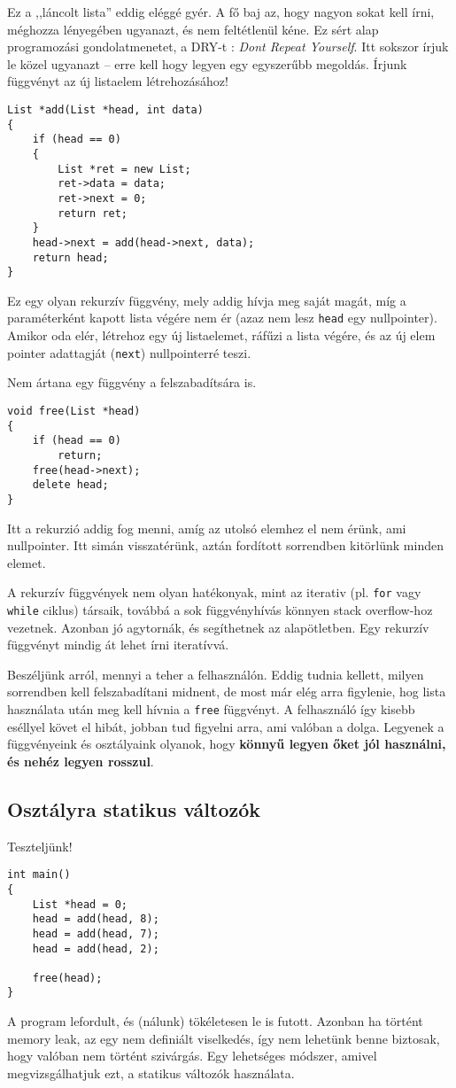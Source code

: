 \documentclass[a4paper,11.5pt]{article}
\begin{document}
	Ez a ,,láncolt lista'' eddig eléggé gyér. A fő baj az, hogy nagyon sokat kell írni, méghozza lényegében ugyanazt, és nem feltétlenül kéne. Ez sért alap programozási gondolatmenetet, a DRY-t : \textit{Dont Repeat Yourself}. Itt sokszor írjuk le közel ugyanazt -- erre kell hogy legyen egy egyszerűbb megoldás. Írjunk függvényt az új listaelem létrehozásához!
	\begin{lstlisting}
List *add(List *head, int data)
{
	if (head == 0)
	{
		List *ret = new List;
		ret->data = data;
		ret->next = 0;
		return ret;
	}
	head->next = add(head->next, data);
	return head;
}
	\end{lstlisting}
	Ez egy olyan rekurzív függvény, mely addig hívja meg saját magát, míg a paraméterként kapott lista végére nem ér (azaz nem lesz \texttt{head} egy nullpointer). Amikor oda elér, létrehoz egy új listaelemet, ráfűzi a lista végére, és az új elem pointer adattagját (\texttt{next}) nullpointerré teszi.
	\medskip
	
	Nem ártana egy függvény a felszabadítsára is.
	\begin{lstlisting}
void free(List *head)
{
	if (head == 0)
		return;
	free(head->next);
	delete head;
}
	\end{lstlisting}
	Itt a rekurzió addig fog menni, amíg az utolsó elemhez el nem érünk, ami nullpointer. Itt simán visszatérünk, aztán fordított sorrendben kitörlünk minden elemet.
	\begin{note}
		A rekurzív függvények nem olyan hatékonyak, mint az iterativ (pl. \texttt{for} vagy \texttt{while} ciklus) társaik, továbbá a sok függvényhívás könnyen stack overflow-hoz vezetnek. Azonban jó agytornák, és segíthetnek az alapötletben. Egy rekurzív függvényt mindig át lehet írni iteratívvá.
	\end{note}
	Beszéljünk arról, mennyi a teher a felhasználón. Eddig tudnia kellett, milyen sorrendben kell felszabadítani midnent, de most már elég arra figylenie, hog lista használata után meg kell hívnia a \texttt{free} függvényt. A felhasználó így kisebb eséllyel követ el hibát, jobban tud figyelni arra, ami valóban a dolga. Legyenek a függvényeink és osztályaink olyanok, hogy \textbf{könnyű legyen őket jól használni, és nehéz legyen rosszul}.
	
	\subsection{Osztályra statikus változók}
	Teszteljünk!
	\begin{lstlisting}
int main()
{
	List *head = 0;
	head = add(head, 8);
	head = add(head, 7);
	head = add(head, 2);
	
	free(head);
}
	\end{lstlisting}
	A program lefordult, és (nálunk) tökéletesen le is futott. Azonban ha történt memory leak, az egy nem definiált viselkedés, így nem lehetünk benne biztosak, hogy valóban nem történt szivárgás. Egy lehetséges módszer, amivel megvizsgálhatjuk ezt, a statikus változók használata.
	
\end{document}
